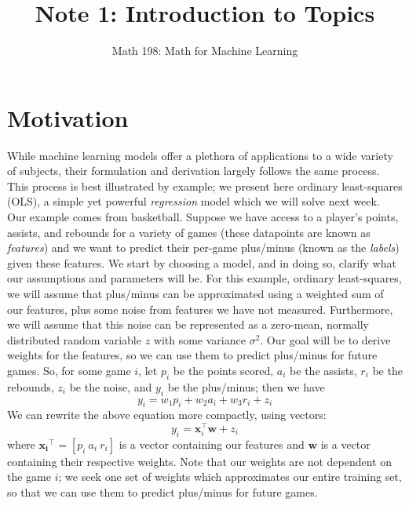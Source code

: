 \documentclass{article}
\title{Note 1: Introduction to Topics}
\author{Math 198: Math for Machine Learning}
\date{}
\begin{document}
\maketitle

\section{Motivation}
While machine learning models offer a plethora of applications to a wide variety of subjects, their formulation and derivation largely follows the same process. This process is best illustrated by example; we present here ordinary least-squares (OLS), a simple yet powerful \textit{regression} model which we will solve next week. \\

\noindent
Our example comes from basketball. Suppose we have access to a player's points, assists, and rebounds for a variety of games (these datapoints are known as \textit{features}) and we want to predict their per-game plus/minus (known as the \textit{labels}) given these features. We start by choosing a model, and in doing so, clarify what our assumptions and parameters will be. For this example, ordinary least-squares, we will assume that plus/minus can be approximated using a weighted sum of our features, plus some noise from features we have not measured. Furthermore, we will assume that this noise can be represented as a zero-mean, normally distributed random variable $z$ with some variance $\sigma^2$. Our goal will be to derive weights for the features, so we can use them to predict plus/minus for future games. So, for some game $i$, let $p_i$ be the points scored, $a_i$ be the assists, $r_i$ be the rebounds, $z_i$ be the noise, and $y_i$ be the plus/minus; then we have $$y_i = w_1p_i + w_2a_i + w_3r_i + z_i$$ We can rewrite the above equation more compactly, using vectors: $$y_i = \mathbf{x}_i^{\top}\mathbf{w} + z_i$$ where $\mathbf{x_i}^{\top} = [p_i\ a_i\ r_i]$ is a vector containing our features and $\mathbf{w}$ is a vector containing their respective weights. Note that our weights are not dependent on the game $i$; we seek one set of weights which approximates our entire training set, so that we can use them to predict plus/minus for future games. \\
\end{document}
